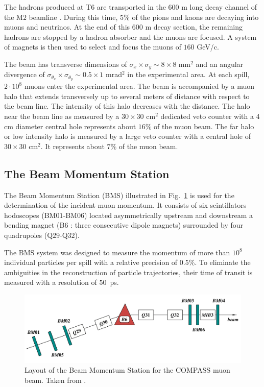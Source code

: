 The hadrons produced at T$6$ are transported in the $600$ m long decay channel of the M$2$ beamline \cite{NIM2015,M2Beam}. During this time, $5$\% of the pions and kaons are decaying into muons and neutrinos. At the end of this $600$ m decay section, the remaining hadrons are stopped by a hadron absorber and the muons are focused. A system of magnets is then used to select and focus the muons of $160$ GeV/c.

The beam has transverse dimensions of $\sigma_x \times \sigma_y \sim 8 \times 8 $ mm$^2$ and an angular divergence of $\sigma_{\theta_x} \times \sigma_{\theta_y} \sim 0.5 \times 1 $ mrad$^2$ in the experimental area. At each spill, $2\cdot10^8$ muons enter the experimental area. The beam is accompanied by a muon halo that extends transversely up to several meters of distance with respect to the beam line. The intensity of this halo decreases with the distance. The halo near the beam line as measured by a $30 \times 30$ cm$^2$ dedicated veto counter with a 4 cm diameter central hole represents about $16$\% of the muon beam. The far halo or low intensity halo is measured by a large veto counter with a central hole of $30 \times 30$ cm$^2$. It represents about $7$\% of the muon beam.

\subsection{The Beam Momentum Station}

The Beam Momentum Station (BMS) illustrated in Fig.~\ref{pic:BMS} is used for the determination of the incident muon momentum. It consists of six scintillators hodoscopes (BM$01$-BM$06$) located asymmetrically upstream and downstream a bending magnet (B$6$ : three consecutive dipole magnets) surrounded by four quadrupoles (Q$29$-Q$32$).

The BMS system was designed to measure the momentum of more than $10^8$ individual particles per spill with a relative precision of $0.5$\%. To eliminate the ambiguities in the reconstruction of particle trajectories, their time of transit is measured with a resolution of $50$~ps.

\begin{figure}[!h]
  \centering
	\includegraphics[scale=0.5]{./gfx/BMS.png}
	\caption{Layout of the Beam Momentum Station for the COMPASS muon beam. Taken from \cite{NIM}.}
	\label{pic:BMS}
\end{figure}

